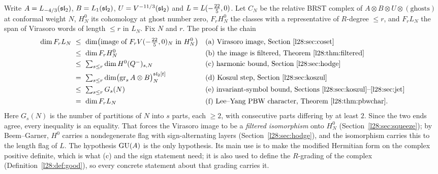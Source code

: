 \begin{remark}\label{l28:rem:arc}
Write $A=L_{-4/3}(\mathfrak{sl}_2)$, $B=L_1(\mathfrak{sl}_2)$, $U=V^{-11/3}(\mathfrak{sl}_2)$ and $L=L(-\tfrac{22}{5},0)$.
Let $C_N$ be the relative BRST complex of $A\otimes B\otimes U\otimes(\text{ghosts})$ at conformal weight $N$,
$H^0_N$ its cohomology at ghost number zero, $F_rH^0_N$ the classes with a representative of $R$-degree $\le r$,
and $F_rL_N$ the span of Virasoro words of length $\le r$ in $L_N$. Fix $N$ and $r$. The proof is the chain
\begin{align*}
\dim F_rL_N
&\ \le\ \dim\bigl(\text{image of }F_rV(-\tfrac{22}{5},0)_N\text{ in }H^0_N\bigr)
  &&\text{(a) Virasoro image, Section~\ref{l28:sec:coset}}\\
&\ \le\ \dim F_rH^0_N
  &&\text{(b) the image is filtered, Theorem~\ref{l28:thm:filtered}}\\
&\ \le\ \textstyle\sum_{s\le r}\dim H^0(Q^-)_{s,N}
  &&\text{(c) harmonic bound, Section~\ref{l28:sec:hodge}}\\
&\ =\ \textstyle\sum_{s\le r}\dim\bigl(\operatorname{gr}_sA\otimes B\bigr)^{\mathfrak{sl}_2[t]}_N
  &&\text{(d) Koszul step, Section~\ref{l28:sec:koszul}}\\
&\ \le\ \textstyle\sum_{s\le r}G_s(N)
  &&\text{(e) invariant-symbol bound, Sections~\ref{l28:sec:koszul}--\ref{l28:sec:jet}}\\
&\ =\ \dim F_rL_N
  &&\text{(f) Lee--Yang PBW character, Theorem~\ref{l28:thm:pbwchar}.}
\end{align*}
Here $G_s(N)$ is the number of partitions of $N$ into $s$ parts, each $\ge2$, with consecutive parts differing by at
least $2$. Since the two ends agree, every inequality is an equality. That forces the Virasoro image to be a
\emph{filtered isomorphism} onto $H^0_N$ (Section~\ref{l28:sec:squeeze}); by Beem--Garner, $H^0$ carries a
nondegenerate flag with sign-alternating layers (Section~\ref{l28:sec:hodge}), and the isomorphism carries this to
the length flag of $L$. The hypothesis $\mathrm{GU}(A)$ is the only hypothesis. Its main use is to make the modified Hermitian form
on the complex positive definite, which is what (c) and the sign statement need; it is also used to define the $R$-grading of the complex
(Definition~\ref{l28:def:good}), so every concrete statement about that grading carries it.


\end{remark}
